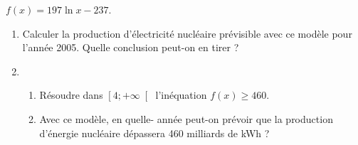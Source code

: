 \begin{center}
$f\left(x\right)=197 \ln x-237$.
\end{center}

\begin{enumerate}
     \item
     Calculer la production d'électricité nucléaire prévisible avec ce modèle pour l'année 2005. Quelle conclusion peut-on en tirer ?
     \item
     \begin{enumerate}[label=\alph*.]
          \item
          Résoudre dans $\left[4 ;+\infty \right[$ l'inéquation $f\left(x\right) \geqslant 460$.
          \item
          Avec ce modèle, en quelle- année peut-on prévoir que la production d'énergie nucléaire dépassera 460 milliards de kWh ?
     \end{enumerate}
\end{enumerate}
